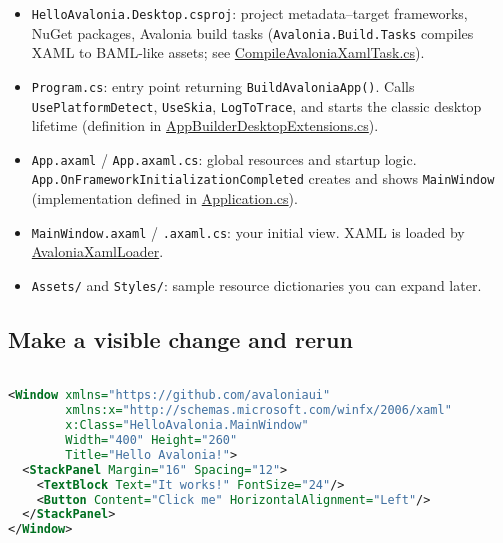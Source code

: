 \begin{itemize}
\tightlist
\item
  \passthrough{\lstinline!HelloAvalonia.Desktop.csproj!}: project
  metadata--target frameworks, NuGet packages, Avalonia build tasks
  (\passthrough{\lstinline!Avalonia.Build.Tasks!} compiles XAML to
  BAML-like assets; see
  \href{https://github.com/AvaloniaUI/Avalonia/blob/master/src/Avalonia.Build.Tasks/CompileAvaloniaXamlTask.cs}{CompileAvaloniaXamlTask.cs}).
\item
  \passthrough{\lstinline!Program.cs!}: entry point returning
  \passthrough{\lstinline!BuildAvaloniaApp()!}. Calls
  \passthrough{\lstinline!UsePlatformDetect!},
  \passthrough{\lstinline!UseSkia!},
  \passthrough{\lstinline!LogToTrace!}, and starts the classic desktop
  lifetime (definition in
  \href{https://github.com/AvaloniaUI/Avalonia/blob/master/src/Avalonia.Desktop/AppBuilderDesktopExtensions.cs}{AppBuilderDesktopExtensions.cs}).
\item
  \passthrough{\lstinline!App.axaml!} /
  \passthrough{\lstinline!App.axaml.cs!}: global resources and startup
  logic.
  \passthrough{\lstinline!App.OnFrameworkInitializationCompleted!}
  creates and shows \passthrough{\lstinline!MainWindow!} (implementation
  defined in
  \href{https://github.com/AvaloniaUI/Avalonia/blob/master/src/Avalonia.Controls/Application.cs}{Application.cs}).
\item
  \passthrough{\lstinline!MainWindow.axaml!} /
  \passthrough{\lstinline!.axaml.cs!}: your initial view. XAML is loaded
  by
  \href{https://github.com/AvaloniaUI/Avalonia/blob/master/src/Avalonia.Markup.Xaml/AvaloniaXamlLoader.cs}{AvaloniaXamlLoader}.
\item
  \passthrough{\lstinline!Assets/!} and
  \passthrough{\lstinline!Styles/!}: sample resource dictionaries you
  can expand later.
\end{itemize}

\subsection{Make a visible change and
rerun}\label{make-a-visible-change-and-rerun}

\begin{lstlisting}[language=XML]

<Window xmlns="https://github.com/avaloniaui"
        xmlns:x="http://schemas.microsoft.com/winfx/2006/xaml"
        x:Class="HelloAvalonia.MainWindow"
        Width="400" Height="260"
        Title="Hello Avalonia!">
  <StackPanel Margin="16" Spacing="12">
    <TextBlock Text="It works!" FontSize="24"/>
    <Button Content="Click me" HorizontalAlignment="Left"/>
  </StackPanel>
</Window>
\end{lstlisting}

